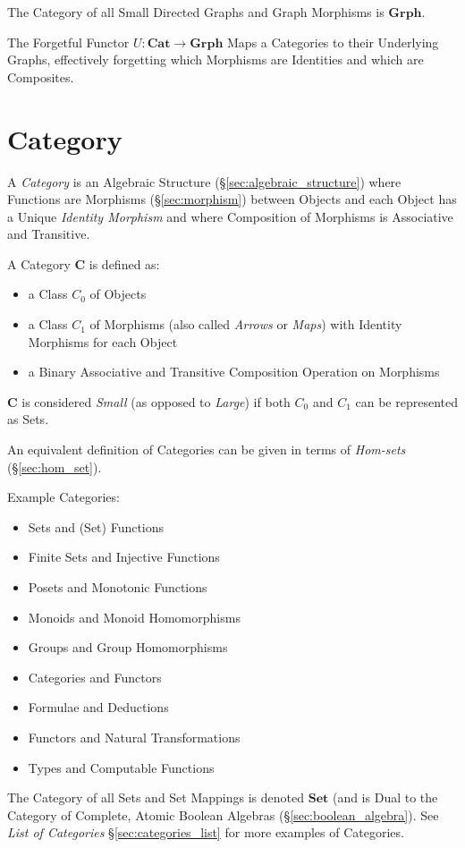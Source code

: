 The Category of all Small Directed Graphs and Graph Morphisms is
$\mathbf{Grph}$.

The Forgetful Functor $U : \mathbf{Cat} \rightarrow \mathbf{Grph}$
Maps a Categories to their Underlying Graphs, effectively forgetting
which Morphisms are Identities and which are Composites.



\section{Category}\label{sec:category}

A \emph{Category} is an Algebraic Structure
(\S\ref{sec:algebraic_structure}) where Functions are Morphisms
(\S\ref{sec:morphism}) between Objects and each Object has a Unique
\emph{Identity Morphism} and where Composition of Morphisms is
Associative and Transitive.

A Category $\mathbf{C}$ is defined as:
\begin{itemize}
\item a Class $C_0$ of Objects
\item a Class $C_1$ of Morphisms (also called \emph{Arrows} or
  \emph{Maps}) with Identity Morphisms for each Object
\item a Binary Associative and Transitive Composition Operation on
  Morphisms
\end{itemize}
$\mathbf{C}$ is considered \emph{Small} (as opposed to \emph{Large})
if both $C_0$ and $C_1$ can be represented as Sets.

An equivalent definition of Categories can be given in terms of
\emph{Hom-sets} (\S\ref{sec:hom_set}).

Example Categories:
\begin{itemize}
\item Sets and (Set) Functions
\item Finite Sets and Injective Functions
\item Posets and Monotonic Functions
\item Monoids and Monoid Homomorphisms
\item Groups and Group Homomorphisms
\item Categories and Functors
\item Formulae and Deductions
\item Functors and Natural Transformations
\item Types and Computable Functions
\end{itemize}
The Category of all Sets and Set Mappings is denoted $\mathbf{Set}$
(and is Dual to the Category of Complete, Atomic Boolean Algebras
(\S\ref{sec:boolean_algebra}). See \emph{List of Categories}
\S\ref{sec:categories_list} for more examples of Categories.

